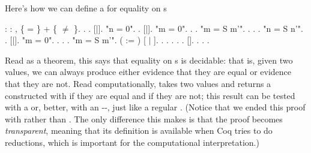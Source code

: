 \documentclass[12pt]{report}
\begin{document}
 Here's how we can define a  for equality on s \begin{coqdoccode}
\coqdocemptyline
\coqdocnoindent
{}  : \coqdockw{\ensuremath{\forall}}   : , \{ = \} + \{ \ensuremath{\not=} \}.\coqdoceol
\coqdocnoindent
{}.\coqdoceol
\coqdocindent{1.00em}
 .\coqdoceol
\coqdocindent{1.00em}
   [|].\coqdoceol
\coqdocindent{1.00em}
 "n = 0".\coqdoceol
\coqdocindent{2.00em}
 .\coqdoceol
\coqdocindent{2.00em}
   [|].\coqdoceol
\coqdocindent{2.00em}
 "m = 0".\coqdoceol
\coqdocindent{3.00em}
. .\coqdoceol
\coqdocindent{2.00em}
 "m = S m'".\coqdoceol
\coqdocindent{3.00em}
.  .  .\coqdoceol
\coqdocindent{1.00em}
 "n = S n'".\coqdoceol
\coqdocindent{2.00em}
 .\coqdoceol
\coqdocindent{2.00em}
   [|].\coqdoceol
\coqdocindent{2.00em}
 "m = 0".\coqdoceol
\coqdocindent{3.00em}
.  .  .\coqdoceol
\coqdocindent{2.00em}
 "m = S m'".\coqdoceol
\coqdocindent{3.00em}
   ( := )  [ \ensuremath{|} ].\coqdoceol
\coqdocindent{3.00em}
.  .  .\coqdoceol
\coqdocindent{3.00em}
.  .    [].  .  .\coqdoceol
\coqdocnoindent
{}.\coqdoceol
\coqdocemptyline
\end{coqdoccode}
Read as a theorem, this says that equality on s is decidable:
    that is, given two  values, we can always produce either
    evidence that they are equal or evidence that they are not.  Read
    computationally,  takes two  values and returns a
     constructed with  if they are equal and  if
    they are not; this result can be tested with a  or, better,
    with an --, just like a regular .  (Notice
    that we ended this proof with  rather than .  The
    only difference this makes is that the proof becomes
    \textit{transparent}, meaning that its definition is available when Coq
    tries to do reductions, which is important for the computational
    interpretation.) 
\end{document}
